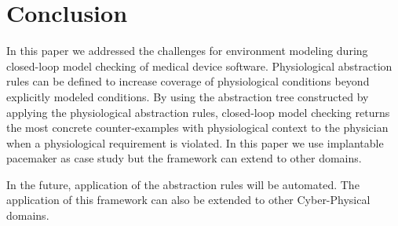 \vspace{-10pt}
\section{Conclusion}
\vspace{-10pt}
\label{conclusions}
In this paper we addressed the challenges for environment modeling during closed-loop model checking of medical device software. Physiological abstraction rules can be defined to increase coverage of physiological conditions beyond explicitly modeled conditions. By using the abstraction tree constructed by applying the physiological abstraction rules, closed-loop model checking returns the most concrete counter-examples with physiological context to the physician when a physiological requirement is violated. In this paper we use implantable pacemaker as case study but the framework can extend to other domains.

In the future, application of the abstraction rules will be automated. The application of this framework can also be extended to other Cyber-Physical domains.